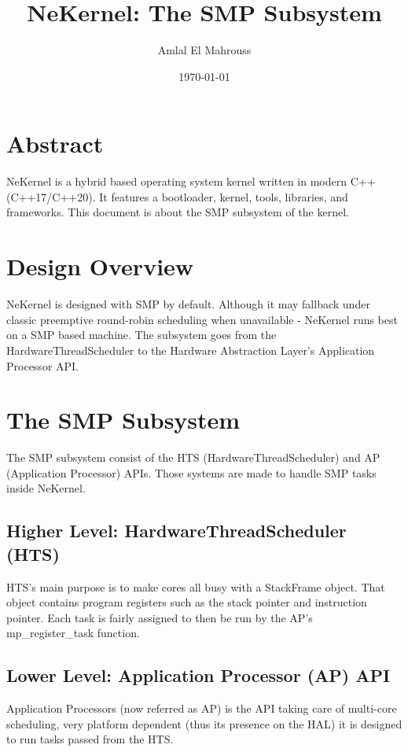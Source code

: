 \documentclass{article}
\title{NeKernel: The SMP Subsystem}
\author{Amlal El Mahrouss}
\date{\today}
\begin{document}
    \maketitle

    \section{Abstract}

    {NeKernel is a hybrid based operating system kernel written in modern C++ (C++17/C++20). It features a bootloader, kernel, tools, libraries, and frameworks. This document is about the SMP subsystem of the kernel.}

    \section{Design Overview}

    {NeKernel is designed with SMP by default. Although it may fallback under classic preemptive round-robin scheduling when unavailable - NeKernel runs best on a SMP based machine. The subsystem goes from the HardwareThreadScheduler to the Hardware Abstraction Layer's Application Processor API.}

    \section{The SMP Subsystem}

    {The SMP subsystem consist of the HTS (HardwareThreadScheduler) and AP (Application Processor) APIs. Those systems are made to handle SMP tasks inside NeKernel.}

    \subsection{Higher Level: HardwareThreadScheduler (HTS)}

    {HTS's main purpose is to make cores all busy with a StackFrame object. That object contains program registers such as the stack pointer and instruction pointer. Each task is fairly assigned to then be run by the AP's mp\_register\_task function.}

    \subsection{Lower Level: Application Processor (AP) API}

    {Application Processors (now referred as AP) is the API taking care of multi-core scheduling, very platform dependent (thus its presence on the HAL) it is designed to run tasks passed from the HTS.}
\end{document}
